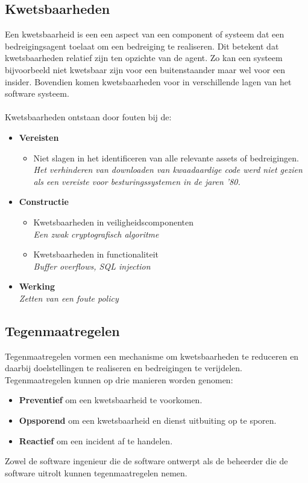 \documentclass[../main.tex]{subfiles}
\begin{document}
\subsection{Kwetsbaarheden}
Een kwetsbaarheid is een een aspect van een component of systeem dat een bedreigingsagent toelaat om een bedreiging te realiseren. Dit betekent dat kwetsbaarheden relatief zijn ten opzichte van de agent. Zo kan een systeem bijvoorbeeld niet kwetsbaar zijn voor een buitenstaander maar wel voor een insider. Bovendien komen kwetsbaarheden voor in verschillende lagen van het software systeem. 
\\\\
Kwetsbaarheden ontstaan door fouten bij de:
\begin{itemize}
	\item \textbf{Vereisten} 
	\begin{itemize}
		\item Niet slagen in het identificeren van alle relevante assets of bedreigingen. 
		\\ \textit{Het verhinderen van downloaden van kwaadaardige code werd niet gezien als een vereiste voor besturingssystemen in de jaren '80.}
	\end{itemize}
	\item \textbf{Constructie}
	\begin{itemize}
		\item Kwetsbaarheden in veiligheidscomponenten
		\\ \textit{Een zwak cryptografisch algoritme}
		\item Kwetsbaarheden in functionaliteit
		\\ \textit{Buffer overflows, SQL injection}
	\end{itemize}
	\item \textbf{Werking} \\ \textit{Zetten van een foute policy}
\end{itemize}


\subsection{Tegenmaatregelen}
Tegenmaatregelen vormen een mechanisme om kwetsbaarheden te reduceren en daarbij doelstellingen te realiseren en bedreigingen te verijdelen. Tegenmaatregelen kunnen op drie manieren worden genomen:
\begin{itemize}
	\item \textbf{Preventief} om een kwetsbaarheid te voorkomen.
	\item \textbf{Opsporend} om een kwetsbaarheid en dienst uitbuiting op te sporen.
	\item \textbf{Reactief} om een incident af te handelen.
\end{itemize}
\noindent
Zowel de software ingenieur die de software ontwerpt als de beheerder die de software uitrolt kunnen tegenmaatregelen nemen.
\end{document}
